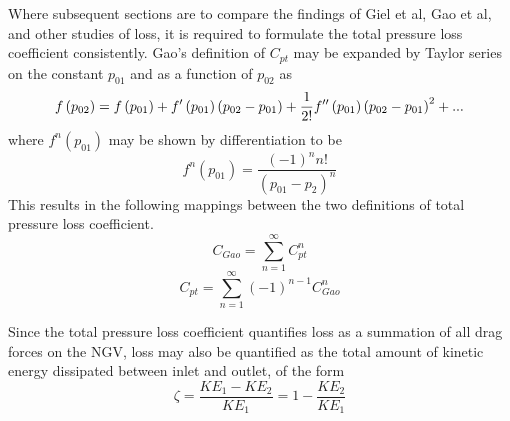 \documentclass[a4paper, 11pt, oneside]{report}
\begin{document}
Where subsequent sections are to compare the findings of Giel et al, Gao et al, and other studies of loss, it is required to formulate the total pressure loss coefficient consistently. Gao's definition of $C_{pt}$ may be expanded by Taylor series on the constant $p_{01}$ and as a function of $p_{02}$ as
\begin{equation}
f\left(p_{02}\right) = \\
f\left(p_{01}\right) +
f'\left(p_{01}\right) \left(p_{02} - p_{01}\right) +
\frac{1}{2!} f''\left(p_{01}\right) \left(p_{02} - p_{01}\right)^2 +
...
\end{equation}
where $f^n\left(p_{01}\right)$ may be shown by differentiation to be
\begin{equation}
f^n\left(p_{01}\right) =
\frac{
	\left(-1\right)^n n !
}{
	(p_{01} - p_2)^n
}
\end{equation}
This results in the following mappings between the two definitions of total pressure loss coefficient.
\begin{equation}
C_{Gao} = 
\sum_{n=1}^{\infty}
C_{pt}^n
\end{equation}
\begin{equation}
C_{pt} = 
\sum_{n=1}^{\infty}
\left(-1\right)^{n-1}
C_{Gao}^n
\end{equation}

Since the total pressure loss coefficient quantifies loss as a summation of all drag forces on the NGV, loss may also be quantified as the total amount of kinetic energy dissipated between inlet and outlet, of the form
\begin{equation}\label{ke_loss_form}
\zeta =
\frac{KE_1 - KE_2}{KE_1}
=
1 - \frac{KE_2}{KE_1}
\end{equation}
\end{document}
